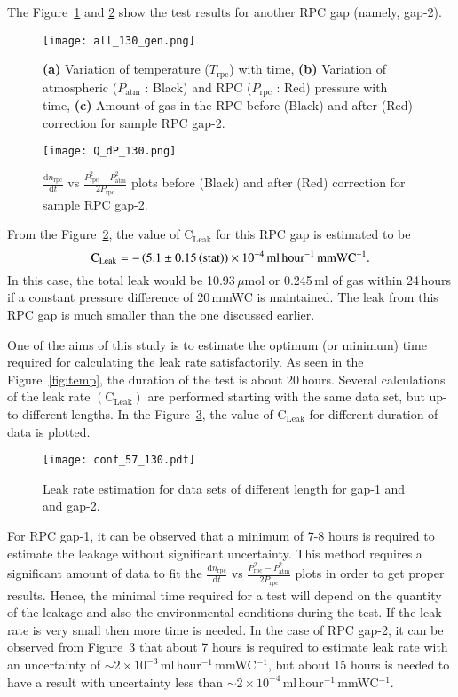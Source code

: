 The Figure~\ref{fig:with1} and \ref{fig:qt1} show the test results for
another RPC gap (namely, gap-2).
\begin{figure}
  \centering
  \texttt{[image: all\_130\_gen.png]}
  \caption{\textbf{(a)} Variation of temperature ($T_{\textrm{rpc}}$) with time,
    \textbf{(b)} Variation of atmospheric ($P_{\textrm{atm}}$ : Black) and RPC
    ($P_{\textrm{rpc}}$ : Red) pressure with time, \textbf{(c)} Amount of gas in
    the RPC before (Black) and after (Red) correction for sample RPC gap-2.}
  \label{fig:with1}
\end{figure}
\begin{figure}
  \centering
  \texttt{[image: Q\_dP\_130.png]}
  \caption{$\frac{\mathrm{d}n_{\textrm{rpc}}}{\mathrm{d}t}$ vs
    $\frac{P_{\textrm{rpc}}^{2}-P_{\textrm{atm}}^{2}}{2P_{\textrm{rpc}}}$ plots
    before (Black) and after (Red) correction for sample RPC gap-2.}
  \label{fig:qt1}
\end{figure}
From the Figure~\ref{fig:qt1}, the value of $\textrm{C}_{\textrm{Leak}}$
for this RPC gap is estimated to be
\[\textrm{C}_{\textrm{Leak}}=-\left(5.1\pm 0.15\left(\textrm{stat}\right)\right)\times 10^{-4}\textrm{\,ml\,hour$^{-1}$\,mmWC$^{-1}$}.\]
In this case, the total leak would be 10.93\,$\mu$mol or 0.245\,ml of
gas within 24\,hours if a constant pressure difference of 20\,mmWC is
maintained.
The leak from this RPC gap is much smaller than the one discussed
earlier.

One of the aims of this study is to estimate the optimum (or minimum) time
required for calculating the leak rate satisfactorily. As seen in the
Figure~\ref{fig:temp}, the duration of the test is about 20\,hours. Several
calculations of the leak rate $\left(\textrm{C}_{\textrm{Leak}}\right)$ are
performed starting with the same data set, but up-to different lengths. In the
Figure~\ref{fig:time}, the value of $\textrm{C}_{\textrm{Leak}}$ for different
duration of data is plotted.
\begin{figure}
  \centering
  \texttt{[image: conf\_57\_130.pdf]}
  \caption{Leak rate estimation for data sets of different length for
    gap-1 and and gap-2.}
  \label{fig:time}
\end{figure}
For RPC gap-1, it can be observed that a minimum of 7-8 hours is
required to estimate the leakage without significant uncertainty. This
method requires a significant amount of data to fit the
$\frac{\mathrm{d}n_{\textrm{rpc}}}{\mathrm{d}t}$ vs
$\frac{P_{\textrm{rpc}}^{2}-P_{\textrm{atm}}^{2}}{2P_{\textrm{rpc}}}$ plots in
order to get proper results. Hence, the minimal time required for a
test will depend on the quantity of the leakage and also the
environmental conditions during the
test. If the leak rate is very small then more time is needed. In the
case of RPC gap-2, it can be observed from Figure~\ref{fig:time}
that about 7 hours is required to estimate leak rate with an
uncertainty of $\sim 2\times 10^{-3}$\,ml\,hour$^{-1}$\,mmWC$^{-1}$,
but about 15 hours is needed to have a result with uncertainty less
than $\sim 2\times 10^{-4}$\,ml\,hour$^{-1}$\,mmWC$^{-1}$.

